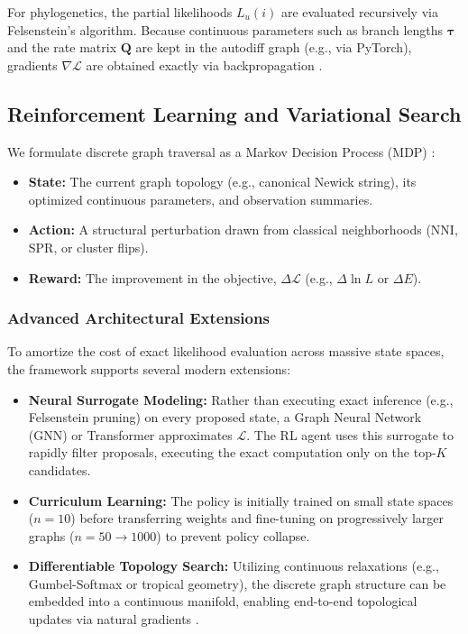 \documentclass[11pt,a4paper]{article}
\newcommand{\Q}{\mathbf{Q}}
\newcommand{\branch}{\boldsymbol{\tau}}
\newcommand{\objective}{\mathcal{L}}
\begin{document}
For phylogenetics, the partial likelihoods $L_u(i)$ are evaluated recursively via Felsenstein's algorithm. Because continuous parameters such as branch lengths $\branch$ and the rate matrix $\Q$ are kept in the autodiff graph (e.g., via PyTorch), gradients $\nabla \objective$ are obtained exactly via backpropagation \citep{goodfellow2016, prince2023}. 

\subsection{Reinforcement Learning and Variational Search}
\label{sec:rl}

We formulate discrete graph traversal as a Markov Decision Process (MDP) \citep{suttonbarto2018}:
\begin{itemize}
    \item \textbf{State:} The current graph topology (e.g., canonical Newick string), its optimized continuous parameters, and observation summaries.
    \item \textbf{Action:} A structural perturbation drawn from classical neighborhoods (NNI, SPR, or cluster flips).
    \item \textbf{Reward:} The improvement in the objective, $\Delta \objective$ (e.g., $\Delta \ln L$ or $\Delta E$).
\end{itemize}

\subsubsection{Advanced Architectural Extensions}
To amortize the cost of exact likelihood evaluation across massive state spaces, the framework supports several modern extensions:
\begin{itemize}
    \item \textbf{Neural Surrogate Modeling:} Rather than executing exact inference (e.g., Felsenstein pruning) on every proposed state, a Graph Neural Network (GNN) or Transformer approximates $\objective$. The RL agent uses this surrogate to rapidly filter proposals, executing the exact computation only on the top-$K$ candidates.
    \item \textbf{Curriculum Learning:} The policy is initially trained on small state spaces ($n=10$) before transferring weights and fine-tuning on progressively larger graphs ($n=50 \to 1000$) to prevent policy collapse.
    \item \textbf{Differentiable Topology Search:} Utilizing continuous relaxations (e.g., Gumbel-Softmax or tropical geometry), the discrete graph structure can be embedded into a continuous manifold, enabling end-to-end topological updates via natural gradients \citep{amari2016}.
\end{itemize}
\end{document}
